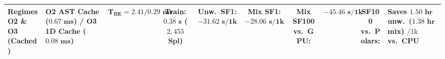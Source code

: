 \documentclass[10pt,a4paper]{article}
\newenvironment{fitasttable}{%
  \begin{lrbox}{\asttblbox}%
}{%
  \end{lrbox}%
  \sbox{\asttblboxB}{%
    \ifdim\wd\asttblbox>0.96\textwidth
      \resizebox{0.96\textwidth}{!}{\usebox{\asttblbox}}%
    \else
      \usebox{\asttblbox}%
    \fi
  }%
  \ifdim\ht\asttblboxB>0.72\textheight
    \resizebox{!}{0.72\textheight}{\usebox{\asttblboxB}}%
  \else
    \usebox{\asttblboxB}%
  \fi
}
\begin{document}
\begin{table}[!htbp]
\begin{fitasttable}
\begin{tabular}{@{}llcccccccl@{}}
\textbf{Regimes O2 \& O3 (Cached)} & \textbf{O2 AST Cache ($\mathbf{0.67\text{ ms}}$) / O3 1D Cache ($\mathbf{0.08\text{ ms}}$)} & $\mathbf{T_{\text{BE}}=2.41 / 0.29\text{ ms}}$ & \textbf{Train: $\mathbf{0.38\text{ s}}$ ($2{,}455$ Spl)} & \textbf{Unw.\ SF1: $\mathbf{-31.62\text{ s}/1\text{k}}$} & \textbf{Mix SF1: $\mathbf{-28.06\text{ s}/1\text{k}}$} & \textbf{Mix SF100 vs.\ GPU:} & $\mathbf{-45.46\text{ s}/1\text{k}}$ & \textbf{SF100 vs.\ Polars:} & \textbf{Saves $\mathbf{1.50\text{ hr}}$ unw.\ ($\mathbf{1.38\text{ hr}}$ mix) $/1\text{k}$ vs.\ CPU} \\
\bottomrule
\end{tabular}
\end{fitasttable}%
\end{table}

\label{tab:v9_mo_energy_ood_repro_synthesis}\label{tab:v9_roadmap_v86_closure}\label{tab:v9_sec3_3_consistency_audit}%
\end{document}
